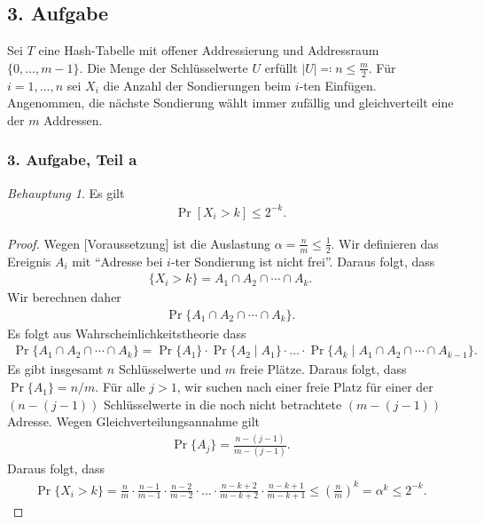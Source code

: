 \documentclass[draft,a5paper]{article}
\theoremstyle{remark}
\newtheorem*{Behauptung}{Behauptung}
\newcommand{\envert}[1]{\left\lvert#1\right\rvert}
\let\abs=\envert
\begin{document}
\subsection*{3. Aufgabe}
Sei \(T\) eine Hash-Tabelle mit offener Addressierung und Addressraum
\(\{0, \ldots, m - 1\}\). Die Menge der Schlüsselwerte \(U\) erfüllt
\(\abs{U} \eqcolon n \le \frac{m}{2}\).  Für \(i = 1, \ldots, n \) sei
\(X_{i}\) die Anzahl der Sondierungen beim \(i\)-ten Einfügen.
Angenommen, die nächste Sondierung wählt immer zufällig und
gleichverteilt eine der \(m\) Addressen.
\subsubsection*{3. Aufgabe, Teil a}
\begin{Behauptung}
  Es gilt \begin{align*}\Pr[X_{i} > k] \le 2^{-k}.\end{align*}
\end{Behauptung}
\begin{proof}
  Wegen [Voraussetzung] ist die Auslastung
  \(\alpha = \frac{n}{m} \le \frac{1}{2}\).  Wir definieren das Ereignis
  \(A_{i}\) mit "`Adresse bei \(i\)-ter Sondierung ist nicht frei"'.
  Daraus folgt, dass
  \begin{align*}\{X_{i} > k\} = A_{1} \cap A_{2} \cap \cdots \cap A_{k}. \end{align*}
  Wir berechnen daher \begin{align*}\Pr\{A_{1} \cap A_{2} \cap \cdots \cap A_{k}\}.\end{align*}
  Es folgt aus Wahrscheinlichkeitstheorie dass
  \begin{align*}
    \Pr\{A_{1} \cap A_{2} \cap \cdots \cap A_{k}\} = \Pr\{A_{1}\} \cdot \Pr\{A_{2} \mid
    A_{1}\} \cdot \ldots \cdot\Pr\{A_{k} \mid A_{1} \cap A_{2} \cap \cdots \cap A_{k-1}\}.
  \end{align*}
  Es gibt insgesamt \(n\) Schlüsselwerte und \(m\) freie Plätze.
  Daraus folgt, dass \(\Pr\{A_{1}\} = n/m\).  Für alle \(j > 1\), wir
  suchen nach einer freie Platz für einer der \((n-(j-1))\)
  Schlüsselwerte in die noch nicht betrachtete \((m-(j-1))\) Adresse.
  Wegen Gleichverteilungsannahme gilt \begin{align*}\Pr\{A_{j}\} =
    \frac{n-(j-1)}{m-(j-1)}.\end{align*}  Daraus folgt, dass
  \begin{align*}
    \Pr\{X_{i} > k\}
    = \frac{n}{m} \cdot \frac{n-1}{m-1} \cdot \frac{n-2}{m-2} \cdot \ldots \cdot
      \frac{n-k+2}{m-k+2} \cdot \frac{n-k+1}{m-k+1}
    \le \left(\frac{n}{m}\right)^{k}
    = \alpha^{k}
    \le 2^{-k}.
  \end{align*}
\end{proof}
\end{document}
